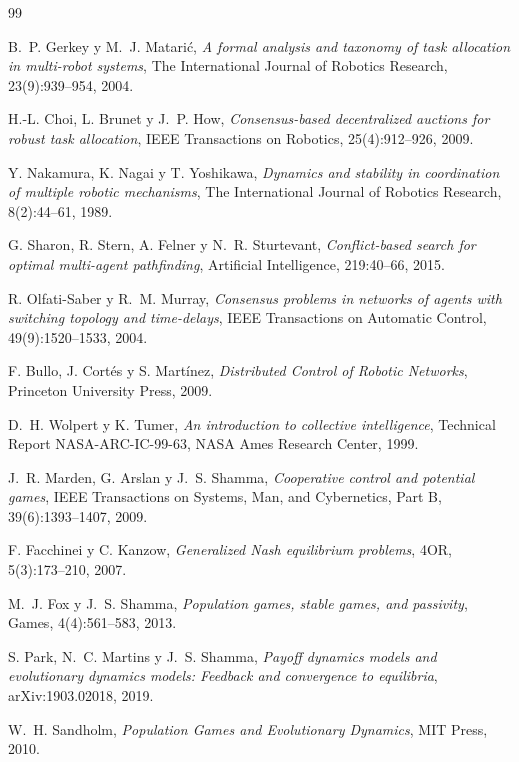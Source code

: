 \documentclass[11pt,a4paper]{article}
\theoremstyle{plain}
\theoremstyle{definition}
\theoremstyle{remark}
\begin{document}
\begin{thebibliography}{99}\small

B.~P. Gerkey y M.~J. Matarić,
\emph{A formal analysis and taxonomy of task allocation in multi-robot systems},
The International Journal of Robotics Research, 23(9):939--954, 2004.

H.-L. Choi, L. Brunet y J.~P. How,
\emph{Consensus-based decentralized auctions for robust task allocation},
IEEE Transactions on Robotics, 25(4):912--926, 2009.

Y. Nakamura, K. Nagai y T. Yoshikawa,
\emph{Dynamics and stability in coordination of multiple robotic mechanisms},
The International Journal of Robotics Research, 8(2):44--61, 1989.

G. Sharon, R. Stern, A. Felner y N.~R. Sturtevant,
\emph{Conflict-based search for optimal multi-agent pathfinding},
Artificial Intelligence, 219:40--66, 2015.

R. Olfati-Saber y R.~M. Murray,
\emph{Consensus problems in networks of agents with switching topology and
time-delays},
IEEE Transactions on Automatic Control, 49(9):1520--1533, 2004.

F. Bullo, J. Cortés y S. Martínez,
\emph{Distributed Control of Robotic Networks},
Princeton University Press, 2009.

D.~H. Wolpert y K. Tumer,
\emph{An introduction to collective intelligence},
Technical Report NASA-ARC-IC-99-63, NASA Ames Research Center, 1999.

J.~R. Marden, G. Arslan y J.~S. Shamma,
\emph{Cooperative control and potential games},
IEEE Transactions on Systems, Man, and Cybernetics, Part B, 39(6):1393--1407,
2009.

F. Facchinei y C. Kanzow,
\emph{Generalized Nash equilibrium problems},
4OR, 5(3):173--210, 2007.

M.~J. Fox y J.~S. Shamma,
\emph{Population games, stable games, and passivity},
Games, 4(4):561--583, 2013.

S. Park, N.~C. Martins y J.~S. Shamma,
\emph{Payoff dynamics models and evolutionary dynamics models: Feedback and
convergence to equilibria},
arXiv:1903.02018, 2019.

W.~H. Sandholm,
\emph{Population Games and Evolutionary Dynamics},
MIT Press, 2010.


\end{thebibliography}
\end{document}
